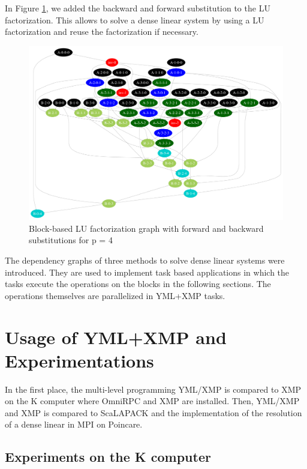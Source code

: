In Figure \ref{fig:graph_sls_lu}, we added the backward and forward substitution to the LU factorization.
This allows to solve a dense linear system by using a LU factorization and reuse the factorization if necessary.

\begin{figure}[h]
	\centering
	\includegraphics[width=\textwidth]{sls_lu_graph_n4}
	\caption{Block-based LU factorization graph with forward and backward substitutions for p = 4\label{fig:graph_sls_lu}}
\end{figure}

The dependency graphs of three methods to solve dense linear systems were introduced.
They are used to implement task based applications in which the tasks execute the operations on the blocks in the following sections.
The operations themselves are parallelized in YML+XMP tasks.

\section{Usage of YML+XMP and Experimentations}

In the first place, the multi-level programming YML/XMP is compared to XMP on the K computer where OmniRPC and XMP are installed.
Then, YML/XMP and XMP is compared to ScaLAPACK and the implementation of the resolution of a dense linear in MPI on Poincare.


\subsection{Experiments on the K computer}


